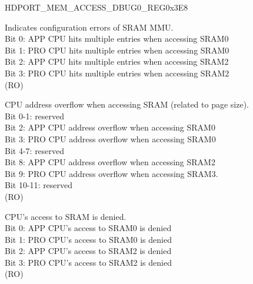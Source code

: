 \begin{register}{H}{DPORT\_MEM\_ACCESS\_DBUG0\_REG}{0x3E8}\label{regdesc:MEMACCESSDBUG0REG}
%
%
%
%
%
\regnewline%
\begin{regdesc}\begin{reglist}
\item [DPORT\_MEM\_MMU\_MULTI\_HIT] Indicates configuration errors of SRAM MMU.\\
Bit 0: APP CPU hits multiple entries when accessing SRAM0\\
Bit 1: PRO CPU hits multiple entries when accessing SRAM0\\
Bit 2: APP CPU hits multiple entries when accessing SRAM2\\
Bit 3: PRO CPU hits multiple entries when accessing SRAM2\\
(RO)
\item [DPORT\_MEM\_ACCESS\_ILLEGAL] CPU address overflow when accessing SRAM (related to page size).\\
Bit 0-1: reserved\\
Bit 2: APP CPU address overflow when accessing SRAM0\\
Bit 3: PRO CPU address overflow when accessing SRAM0\\
Bit 4-7: reserved\\
Bit 8: APP CPU address overflow when accessing SRAM2\\
Bit 9: PRO CPU address overflow when accessing SRAM3.\\
Bit 10-11: reserved\\
(RO)
\item [DPORT\_MEM\_ACCESS\_DENY] CPU's access to SRAM is denied.\\ 
Bit 0: APP CPU's access to SRAM0 is denied\\
Bit 1: PRO CPU's access to SRAM0 is denied\\
Bit 2: APP CPU's access to SRAM2 is denied\\
Bit 3: PRO CPU's access to SRAM2 is denied\\
(RO)
\end{reglist}\end{regdesc}
\end{register}

